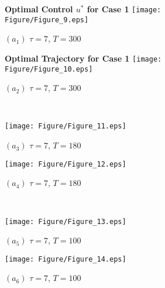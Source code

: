 \documentclass[10pt,letterpaper]{article}
\begin{document}
\begin{figure}[H]
    \centering
    \begin{subfigure}[t]{0.48\textwidth}
        \centering
        \textbf{Optimal Control $u^*$ for Case 1}
        \texttt{[image: Figure/Figure\_9.eps]}
        \par\vspace{1pt} $(a_1)$ $\tau = 7$, $T = 300$ 
    \end{subfigure}
    \hfill
    \begin{subfigure}[t]{0.48\textwidth}
        \centering
        \textbf{Optimal Trajectory for Case 1}
        \texttt{[image: Figure/Figure\_10.eps]}
        \par\vspace{1pt} $(a_2)$ $\tau = 7$, $T = 300$ 
    \end{subfigure}
    \\[10pt] %
    
    \begin{subfigure}[t]{0.48\textwidth}
        \centering
        \texttt{[image: Figure/Figure\_11.eps]}
        \par\vspace{1pt} $(a_3)$ $\tau = 7$, $T = 180$ 
    \end{subfigure}
    \hfill
    \begin{subfigure}[t]{0.48\textwidth}
        \centering
        \texttt{[image: Figure/Figure\_12.eps]}
        \par\vspace{1pt} $(a_4)$ $\tau = 7$, $T = 180$ 
    \end{subfigure}
    \\[10pt]
    
    \begin{subfigure}[t]{0.48\textwidth}
        \centering
        \texttt{[image: Figure/Figure\_13.eps]}
        \par\vspace{1pt} $(a_5)$ $\tau = 7$, $T = 100$ 
    \end{subfigure}
    \hfill
    \begin{subfigure}[t]{0.48\textwidth}
        \centering
        \texttt{[image: Figure/Figure\_14.eps]}
        \par\vspace{1pt} $(a_6)$ $\tau = 7$, $T = 100$
    \end{subfigure}
    \\[10pt]
    

\end{figure}
\end{document}
